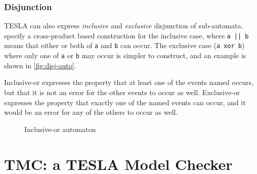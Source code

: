 \subsubsection{Disjunction}

TESLA can also express \emph{inclusive} and \emph{exclusive} disjunction of
sub-automata. \textcite{anderson_tesla:_2014} specify a cross-product based
construction for the inclusive case, where \texttt{a || b} means that either or
both of \texttt{a} and \texttt{b} can occur. The exclusive case (\texttt{a xor
b}) where only one of \texttt{a} or \texttt{b} may occur is simpler to
construct, and an example is shown in \autoref{fig:disj-auto}.

Inclusive-or expresses the property that at least one of the events named
occurs, but that it is not an error for the other events to occur as well.
Exclusive-or expresses the property that exactly one of the named events can
occur, and it would be an error for any of the others to occur as well.

\begin{figure}
  \centering
  \caption{Inclusive-or automaton}
  \label{fig:disj-auto}
\end{figure}

\section{TMC: a TESLA Model Checker} \label{sec:checking}

